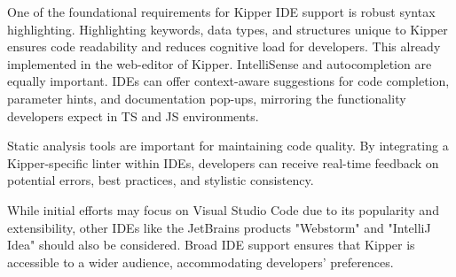 One of the foundational requirements for Kipper IDE support is robust syntax highlighting. Highlighting keywords, data types, and structures unique to Kipper ensures code readability and reduces cognitive load for developers. This already implemented in the web-editor of Kipper. IntelliSense and autocompletion are equally important. IDEs can offer context-aware suggestions for code completion, parameter hints, and documentation pop-ups, mirroring the functionality developers expect in TS and JS environments.

Static analysis tools are important for maintaining code quality. By integrating a Kipper-specific linter within IDEs, developers can receive real-time feedback on potential errors, best practices, and stylistic consistency.

While initial efforts may focus on Visual Studio Code due to its popularity and extensibility, other IDEs like the JetBrains products "Webstorm" and "IntelliJ Idea" should also be considered. Broad IDE support ensures that Kipper is accessible to a wider audience, accommodating developers’ preferences.

